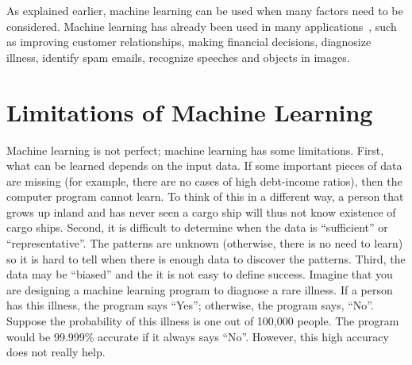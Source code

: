 As explained earlier, machine learning can be used when many factors
need to be considered.  Machine learning has already been used in many
applications~\cite{Alpaydin2010IntroductiontoMachine}, such as
improving customer relationships, making financial decisions,
diagnosize illness, identify spam emails, recognize speeches and
objects in images.


\section{Limitations of Machine Learning}

Machine learning is not perfect; machine learning has some
limitations.  First, what can be learned depends on the input data. If
some important pieces of data are missing (for example, there are no
cases of high debt-income ratios), then the computer program cannot
learn.  To think of this in a different way, a person that grows up
inland and has never seen a cargo ship will thus not know existence of
cargo ships.  Second, it is difficult to determine when the data is
``sufficient'' or ``representative''.  The patterns are unknown
(otherwise, there is no need to learn) so it is hard to tell when
there is enough data to discover the patterns.  Third, the data may be
``biased'' and the it is not easy to define success. Imagine that you
are designing a machine learning program to diagnose a rare illness.
If a person has this illness, the program says ``Yes''; otherwise, the
program says, ``No''.  Suppose the probability of this illness is one
out of 100,000 people.  The program would be 99.999\% accurate if it
always says ``No''.  However, this high accuracy does not really help.


\begin{comment}
Fourth, each machine learning program reflects a specific {\it model}
that is designed to recognize the patterns in the data.  Different
models have different capabilities: some models can recognize complex
patterns and some others cannot.  This is an analogy about models'
capabilities: humans are the only known species that can handle
written communications.  Some other animals can communicate in sound
that is not understood by humans. It is not yet clear whether humans
will ever be able to understand the sound.  Maybe human brains are
incapable of learning the sound.

\end{comment}


